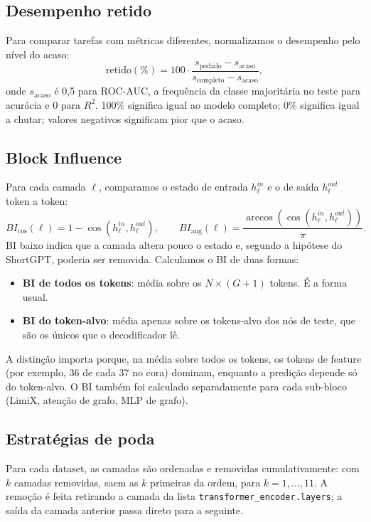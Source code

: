 \documentclass[11pt,a4paper]{article}
\begin{document}
\subsection{Desempenho retido}

Para comparar tarefas com métricas diferentes, normalizamos o desempenho pelo nível do acaso:
\begin{equation}
\text{retido}(\%) = 100 \cdot \frac{s_{\text{podado}} - s_{\text{acaso}}}{s_{\text{completo}} - s_{\text{acaso}}},
\end{equation}
onde $s_{\text{acaso}}$ é 0,5 para ROC-AUC, a frequência da classe majoritária no teste para acurácia e 0 para $R^2$. 100\% significa igual ao modelo completo; 0\% significa igual a chutar; valores negativos significam pior que o acaso.

\subsection{Block Influence}

Para cada camada $\ell$, comparamos o estado de entrada $h_\ell^{in}$ e o de saída $h_\ell^{out}$ token a token:
\begin{equation}
BI_{\cos}(\ell) = 1 - \cos\!\left(h_\ell^{in}, h_\ell^{out}\right), \qquad
BI_{\text{ang}}(\ell) = \frac{\arccos\!\left(\cos(h_\ell^{in}, h_\ell^{out})\right)}{\pi}.
\end{equation}
BI baixo indica que a camada altera pouco o estado e, segundo a hipótese do ShortGPT, poderia ser removida. Calculamos o BI de duas formas:
\begin{itemize}
  \item \textbf{BI de todos os tokens}: média sobre os $N \times (G+1)$ tokens. É a forma usual.
  \item \textbf{BI do token-alvo}: média apenas sobre os tokens-alvo dos nós de teste, que são os únicos que o decodificador lê.
\end{itemize}
A distinção importa porque, na média sobre todos os tokens, os tokens de feature (por exemplo, 36 de cada 37 no cora) dominam, enquanto a predição depende só do token-alvo. O BI também foi calculado separadamente para cada sub-bloco (LimiX, atenção de grafo, MLP de grafo).

\subsection{Estratégias de poda}

Para cada dataset, as camadas são ordenadas e removidas cumulativamente: com $k$ camadas removidas, saem as $k$ primeiras da ordem, para $k = 1, \dots, 11$. A remoção é feita retirando a camada da lista \texttt{transformer\_encoder.layers}; a saída da camada anterior passa direto para a seguinte.
\end{document}
